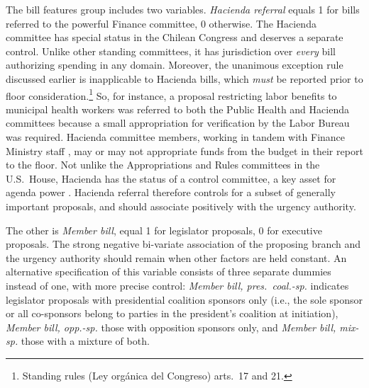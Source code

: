 \documentclass[letter,12pt]{article}
\begin{document}
The bill features group includes two variables. \emph{Hacienda referral} equals 1 for bills referred to the powerful Finance committee, 0 otherwise. The Hacienda committee has special status in the Chilean Congress and deserves a separate control. Unlike other standing committees, it has jurisdiction over \emph{every} bill authorizing spending in any domain. Moreover, the unanimous exception rule discussed earlier is inapplicable to Hacienda bills, which \emph{must} be reported prior to floor consideration.\footnote{Standing rules (Ley orgánica del Congreso) arts.\ 17 and 21.} So, for instance, a proposal restricting labor benefits to municipal health workers was referred to both the Public Health and Hacienda committees because a small appropriation for verification by the Labor Bureau was required. Hacienda committee members, working in tandem with Finance Ministry staff \citep{aleman.navia.UrgChi.2009}, may or may not appropriate funds from the budget in their report to the floor. Not unlike the Appropriations and Rules committees in the U.S.\ House, Hacienda has the status of a control committee, a key asset for agenda power \citep{kiewiet.mccubbins.1991}. Hacienda referral therefore controls for a subset of generally important proposals, and should associate positively with the urgency authority. 

The other is \emph{Member bill}, equal 1 for legislator proposals, 0 for executive proposals. The strong negative bi-variate association of the proposing branch and the urgency authority should remain when other factors are held constant. An alternative specification of this variable consists of three separate dummies instead of one, with more precise control: \emph{Member bill, pres.~coal.-sp.} indicates legislator proposals with presidential coalition sponsors only (i.e., the sole sponsor or all co-sponsors belong to parties in the president's coalition at initiation), \emph{Member bill, opp.-sp.} those with opposition sponsors only, and \emph{Member bill, mix-sp.} those with a mixture of both. 
\end{document}
